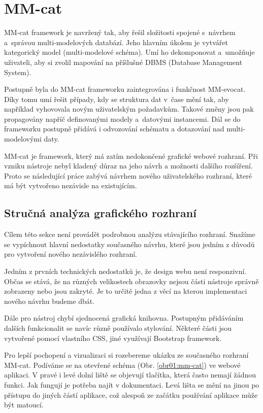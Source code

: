 \section{MM-cat}

MM-cat framework je navržený tak, aby řešil složitosti spojené s~návrhem a~správou multi-modelových databází. Jeho hlavním úkolem je vytvářet kategorický model (multi-modelové schéma). Umí ho dekomponovat a~umožňuje uživateli, aby si zvolil mapování na příšlušné DBMS (Database Management System).

Postupně byla do MM-cat frameworku zaintegrována i funkčnost MM-evocat. Díky tomu umí řešit případy, kdy se struktura dat v~čase mění tak, aby například vyhovovala novým uživatelským požadavkům. Takové změny jsou pak propagovány napříč definovanými modely a~datovými instancemi. Dál se do frameworku postupně přidává i odvozování schématu a dotazování nad multi-modelovými daty.

MM-cat je framework, který má zatím nedokončené grafické webové rozhraní. Při vzniku nástroje nebyl kladený důraz na jeho návrh a možnosti dalšího rozšíření. Proto se následující práce zabývá návrhem nového uživatelského rozhraní, které má být vytvořeno nezávisle na existujícím.

\subsection{Stručná analýza grafického rozhraní}

Cílem této sekce není provádět podrobnou analýzu stávajícího rozhraní. Snažíme se vypíchnout hlavní nedostatky současného návrhu, které jsou jedním z důvodů pro vytvoření nového nezávislého rozhraní.

Jedním z prvních technických nedostatků je, že design webu není responzivní. Občas se stává, že na různých velikostech obrazovky nejsou části nástroje správně zobrazeny nebo jsou zakryté. Je to určitě jedna z věcí na kterou implementaci nového návrhu budeme dbát.

Dále pro nástroj chybí sjednocená grafická knihovna. Postupným přidáváním dalších funkcionalit se navíc různě používalo stylování. Některé části jsou vytvořené pomocí vlastního CSS, jiné využívají Bootstrap framework.

Pro lepší pochopení a vizualizaci si rozebereme ukázku ze současného rozhraní MM-cat. Podíváme se na otevřené schéma (Obr. \ref{obr01:mm-cat}) ve webové aplikaci. V pravé i levé dolní liště se objevují tlačítka, která často nemají žádnou funkci. Jak fungují je potřeba najít v dokumentaci. Levá lišta se mění na jinou po přístupu do jiných částí aplikace, což alespoň ze začátku používání aplikace může být matoucí.

